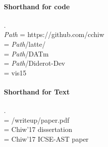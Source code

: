 \paragraph{Shorthand for code}.\\
\textit{Path} = https://github.com/cchiw\\
\exs{}  = \textit{Path}/latte/\\
\datm{} = \textit{Path}/DATm\\
\branch{} = \textit{Path}/Diderot-Dev\\
\branchV{} =  vis15

\paragraph{Shorthand for Text}.\\
\doc{} = \exs{}/writeup/paper.pdf\\
\diss{} = Chiw'17 dissertation\\
\paperAst{} = Chiw'17 ICSE-AST paper